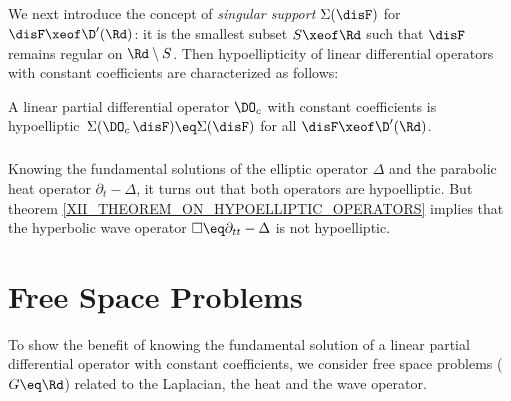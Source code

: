 \documentclass[11pt,twoside]{article}
\def\G{G}
\begin{document}
\subparagraph{}
We next introduce the concept of \textit{singular support} $\Sigma(\disF)$
for $\disF \xeof \D'(\Rd)$:
it is the smallest subset $S \xeof \Rd$
such that $\disF$ remains regular on $\Rd \setminus S$.
Then hypoellipticity of linear differential operators
with constant coefficients are characterized as follows:

\begin{theorem1}\label{XII_THEOREM_ON_HYPOELLIPTIC_OPERATORS}
A linear partial differential operator $\DO_c$ with constant coefficients
is hypoelliptic
\iff
$\,\Sigma(\DO_c \, \disF) \eq \Sigma(\disF)$ for all $\disF \xeof \D'(\Rd)$.
\end{theorem1}

\subparagraph{}
Knowing the fundamental solutions of the elliptic operator $\Delta$ and
the parabolic heat operator $\partial_t-\Delta$,
it turns out that both operators are hypoelliptic.
But theorem \ref{XII_THEOREM_ON_HYPOELLIPTIC_OPERATORS} implies
that the hyperbolic wave operator $\Box \eq \partial_{tt}-\Delta$
is not hypoelliptic.

\section{Free Space Problems}
To show the benefit of knowing the fundamental solution
of a linear partial differential operator with constant coefficients,
we consider free space problems ($\G \eq \Rd$)
related to the Laplacian, the heat and the wave operator.
\end{document}
